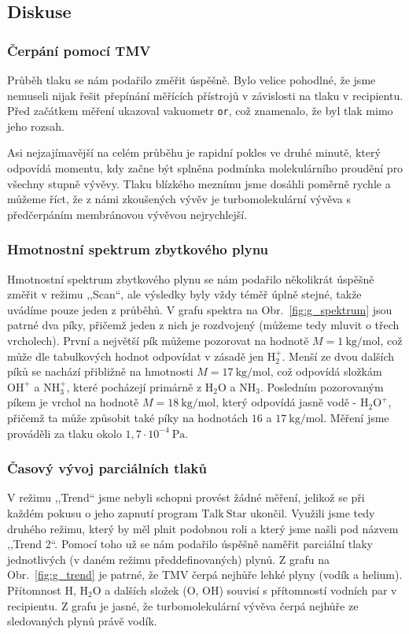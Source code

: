 \documentclass[english]{article}
\newcommand{\unit}[1]{~\mathrm{#1}}
\begin{document}
	\subsection{Diskuse}
		\subsubsection{Čerpání pomocí TMV}
	    	Průběh tlaku se nám podařilo změřit úspěšně. Bylo velice pohodlné, že jsme nemuseli nijak řešit přepínání měřících přístrojů v závislosti na tlaku v recipientu. Před začátkem měření ukazoval vakuometr \texttt{or}, což znamenalo, že byl tlak mimo jeho rozsah. 
	    	
	    	Asi nejzajímavější na celém průběhu je rapidní pokles ve druhé minutě, který odpovídá momentu, kdy začne být splněna podmínka molekulárního proudění pro všechny stupně vývěvy. Tlaku blízkého meznímu jsme dosáhli poměrně rychle a můžeme říct, že z námi zkoušených vývěv je turbomolekulární vývěva s předčerpáním membránovou vývěvou nejrychlejší. 
	
		\subsubsection{Hmotnostní spektrum zbytkového plynu}
			Hmotnostní spektrum zbytkového plynu se nám podařilo několikrát úspěšně změřit v režimu ,,Scan``, ale výsledky byly vždy téměř úplně stejné, takže uvádíme pouze jeden z průběhů. V grafu spektra na Obr.~\ref{fig:g_spektrum} jsou patrné dva píky, přičemž jeden z nich je rozdvojený (můžeme tedy mluvit o třech vrcholech). První a největší pík můžeme pozorovat na hodnotě $M=1\unit{kg/mol}$, což může dle tabulkových hodnot \cite{bib:hmot_tabulka} odpovídat v zásadě jen $\mathrm{H_2^+}$. Menší ze dvou dalších píků se nachází přibližně na hmotnosti $M=17\unit{kg/mol}$, což odpovídá složkám $\mathrm{OH^+}$ a $\mathrm{NH_3^+}$, které pocházejí primárně z $\mathrm{H_2O}$ a $\mathrm{NH_3}$. Posledním pozorovaným píkem je vrchol na hodnotě $M=18\unit{kg/mol}$, který odpovídá jasně vodě - $\mathrm{H_2O^+}$, přičemž ta může způsobit také píky na hodnotách $16$ a $17\unit{kg/mol}$. Měření jsme prováděli za tlaku okolo $1,7\cdot 10^{-4}\unit{Pa}$.
			
		\subsubsection{Časový vývoj parciálních tlaků}
			V režimu ,,Trend`` jsme nebyli schopni provést žádné měření, jelikož se při každém pokusu o jeho zapnutí program $\mathrm{Talk~Star}$ ukončil. Využili jsme tedy druhého režimu, který by měl plnit podobnou roli a který jsme našli pod názvem ,,Trend 2``. Pomocí toho už se nám podařilo úspěšně naměřit parciální tlaky jednotlivých (v daném režimu předdefinovaných) plynů. Z grafu na Obr.~\ref{fig:g_trend} je patrné, že TMV čerpá nejhůře lehké plyny (vodík a helium). Přítomnost $\mathrm{H}$, $\mathrm{H_2O}$ a dalších složek ($\mathrm{O}$, $\mathrm{OH}$) souvisí s přítomností vodních par v recipientu. Z grafu je jasné, že turbomolekulární vývěva čerpá nejhůře ze sledovaných plynů právě vodík.
			
\end{document}
